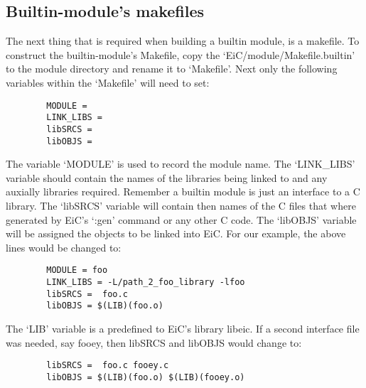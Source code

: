 \subsection{Builtin-module's makefiles}
\label{sec:builtin_makefile}

The next thing that is required when building a builtin module, is a
makefile.  To construct the builtin-module's Makefile, copy the
`EiC/module/Makefile.builtin' to the module directory and rename it to
`Makefile'. Next only the following variables within the `Makefile'
will need to set:

\small
\begin{verbatim}
        MODULE =
        LINK_LIBS =
        libSRCS =  
        libOBJS =
\end{verbatim}
\normalsize

The variable `MODULE' is used to record the module name.  The
`LINK\_LIBS' variable should contain the names of the libraries being
linked to and any auxially libraries required. Remember a builtin
module is just an interface to a C library.  The `libSRCS' variable
will contain then names of the C files that where generated by EiC's
`:gen' command or any other C code.  The `libOBJS' variable will be
assigned the objects to be linked into EiC. For our example, the above
lines would be changed to:

\small
\begin{verbatim}
        MODULE = foo
        LINK_LIBS = -L/path_2_foo_library -lfoo
        libSRCS =  foo.c
        libOBJS = $(LIB)(foo.o)
\end{verbatim}
\normalsize

The `LIB' variable is a predefined to EiC's library libeic. If a
second interface file was needed, say fooey, then libSRCS and libOBJS
would change to:

\small
\begin{verbatim}
        libSRCS =  foo.c fooey.c
        libOBJS = $(LIB)(foo.o) $(LIB)(fooey.o)
\end{verbatim}
\normalsize







